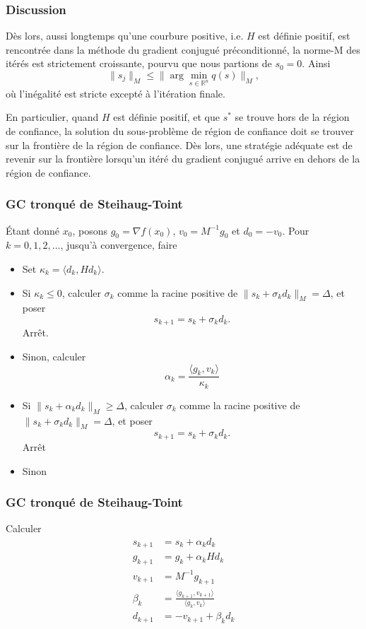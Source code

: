\documentclass[usepdftitle=false]{beamer}
\begin{document}
\begin{frame}
\frametitle{Discussion}

Dès lors, aussi longtemps qu'une courbure positive, i.e. $H$ est définie positif, est rencontrée dans la méthode du gradient conjugué préconditionné, la norme-M des itérés est strictement croissante, pourvu que nous partions de $s_0 = 0$.
Ainsi
$$
\| s_j \|_M \leq \| \arg \min_{s \in \mathbb{R}^n} q(s) \|_M,
$$
où l'inégalité est stricte excepté à l'itération finale.

\mbox{}

En particulier, quand $H$ est définie positif, et que $s^*$ se trouve hors de la région de confiance, la solution du sous-problème de région de confiance doit se trouver sur la frontière de la région de confiance.
Dès lors, une stratégie adéquate est de revenir sur la frontière lorsqu'un itéré du gradient conjugué arrive en dehors de la région de confiance.

\end{frame}

\begin{frame}
\frametitle{GC tronqué de Steihaug-Toint}
	
	
Étant donné $x_0$, posons $g_0 = \nabla f(x_0)$, $v_0 = M^{-1} g_0$ et $d_0 = -v_0$.
Pour $k = 0,1,2,\ldots$, jusqu'à convergence, faire
\begin{itemize}
\item
Set $\kappa_k = \langle d_k, Hd_k \rangle$.
\item Si $\kappa_k \leq 0$, calculer $\sigma_k$ comme la racine positive de
$\| s_k + \sigma_k d_k \|_M = \Delta$, et poser
$$
s_{k+1} = s_k + \sigma_kd_k.
$$
Arrêt.
\item
Sinon, calculer
$$
\alpha_k = \frac{\langle g_k, v_k \rangle}{\kappa_k}
$$
\item
Si $\| s_k + \alpha_k d_k \|_M \geq \Delta$,
 calculer $\sigma_k$ comme la racine positive de
$\| s_k + \sigma_k d_k \|_M = \Delta$, et poser
$$
s_{k+1} = s_k + \sigma_kd_k.
$$
Arrêt
\item
Sinon
\end{itemize}

\end{frame}

\begin{frame}
\frametitle{GC tronqué de Steihaug-Toint}
Calculer
	\begin{align*}
	s_{k+1} &= s_k + \alpha_k d_k \\
	g_{k+1} &= g_k + \alpha_k H d_k \\
	v_{k+1} &= M^{-1}g_{k+1} \\
	\beta_k &= \frac{\langle g_{k+1}, v_{k+1} \rangle}{\langle g_k, v_k \rangle} \\
	d_{k+1} &= -v_{k+1} + \beta_k d_k
	\end{align*}
	

\end{frame}
\end{document}
